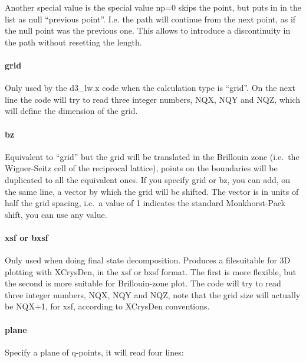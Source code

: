 \documentclass[
]{article}
\begin{document}
Another special value is the special value np=0 skips the point, but
puts in in the list as null \enquote{previous point}. I.e. the path will
continue from the next point, as if the null point was the previous one.
This allows to introduce a discontinuity in the path without resetting
the length.

\hypertarget{grid}{%
\paragraph{grid}\label{grid}}

Only used by the d3\_lw.x code when the calculation type is
\enquote{grid}. On the next line the code will try to read three integer
numbers, NQX, NQY and NQZ, which will define the dimension of the grid.

\hypertarget{bz}{%
\paragraph{bz}\label{bz}}

Equivalent to \enquote{grid} but the grid will be translated in the
Brillouin zone (i.e.~the Wigner-Seitz cell of the reciprocal lattice),
points on the boundaries will be duplicated to all the equivalent ones.
If you specify grid or bz, you can add, on the same line, a vector by
which the grid will be shifted. The vector is in units of half the grid
spacing, i.e.~a value of 1 indicates the standard Monkhorst-Pack shift,
you can use any value.

\hypertarget{xsf-or-bxsf}{%
\paragraph{xsf or bxsf}\label{xsf-or-bxsf}}

Only used when doing final state decomposition. Produces a filesuitable
for 3D plotting with XCrysDen, in the xsf or bxsf format. The first is
more flexible, but the second is more suitable for Brillouin-zone plot.
The code will try to read three integer numbers, NQX, NQY and NQZ, note
that the grid size will actually be NQX+1, for xsf, according to
XCrysDen conventions.

\hypertarget{plane}{%
\paragraph{plane}\label{plane}}

Specify a plane of q-points, it will read four lines:
\end{document}
